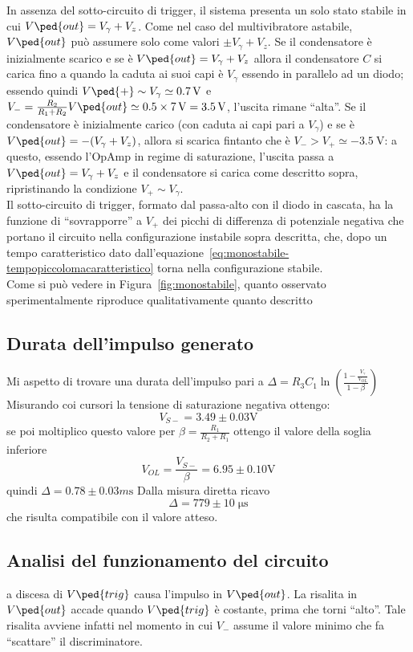 \documentclass[10pt,a4paper]{article}
\begin{document}
In assenza del sotto-circuito di trigger, il sistema presenta un solo stato stabile in cui $ V\ped{out} =  V_{\gamma} + V_{z} $.
Come nel caso del multivibratore astabile, $ V\ped{out} $ può assumere solo come valori $ \pm V_{\gamma} + V_{z} $.
Se il condensatore è inizialmente scarico e se è $ V\ped{out} = V_{\gamma} + V_{z} $ allora il condensatore $ C $ si carica fino a quando la caduta ai suoi capi è $ V_{\gamma} $ essendo in parallelo ad un diodo; essendo quindi $ V\ped{+} \sim V_{\gamma} \simeq \SI{0.7}{\volt} $ e $ V_{-} = \frac{R_{2}}{R_{1} + R_{2}} V\ped{out} \simeq 0.5 \times \SI{7}{\volt} = \SI{3.5}{\volt} $, l'uscita rimane ``alta''.
Se il condensatore è inizialmente carico (con caduta ai capi pari a $ V_{\gamma} $) e se è $ V\ped{out} = -(V_{\gamma} + V_{z}) $, allora si scarica fintanto che è $ V_{-} > V_{+} \simeq -\SI{3.5}{\volt} $: a questo, essendo l'OpAmp in regime di saturazione, l'uscita passa a $ V\ped{out} = V_{\gamma} + V_{z} $ e il condensatore si carica come descritto sopra, ripristinando la condizione $ V_{+} \sim V_{\gamma} $. \\

Il sotto-circuito di trigger, formato dal passa-alto con il diodo in cascata, ha la funzione di ``sovrapporre'' a $ V_{+} $ dei picchi di differenza di potenziale negativa che portano il circuito nella configurazione instabile sopra descritta, che, dopo un tempo caratteristico dato dall'equazione~\eqref{eq:monostabile-tempopiccolomacaratteristico} torna nella configurazione stabile. \\

Come si può vedere in Figura~\ref{fig:monostabile}, quanto osservato sperimentalmente riproduce qualitativamente quanto descritto

\subsection{Durata dell'impulso generato}
Mi aspetto di trovare una durata dell'impulso pari a $\Delta= R_3 C_1 \ln(\frac{1 - \frac{V_\gamma}{V_{OL}}}{1 - \beta})$
Misurando coi cursori la tensione di saturazione negativa ottengo:
\[
V_{S-}= 3.49 \pm 0.03 \si{\V}
\]
se poi moltiplico questo valore per $\beta=\frac{R_1}{R_2+R_1}$ ottengo il valore della soglia inferiore
\[
V_{OL} = \frac{V_{S-}}{\beta} = 6.95 \pm 0.10 \si{\V}
\]
quindi $\Delta= 0.78 \pm 0.03 \si{m\s}$
Dalla misura diretta ricavo
\[
\Delta= 779 \pm 10 \;\si{\micro\s}
\]
che risulta compatibile con il valore atteso.
\subsection{Analisi del funzionamento del circuito}
a discesa di $ V\ped{trig} $ causa l'impulso in $ V\ped{out} $. La risalita in $ V\ped{out} $ accade quando $ V\ped{trig} $ è costante, prima che torni ``alto''. Tale risalita avviene infatti nel momento in cui $ V_{-} $ assume il valore minimo che fa ``scattare'' il discriminatore.
\end{document}
